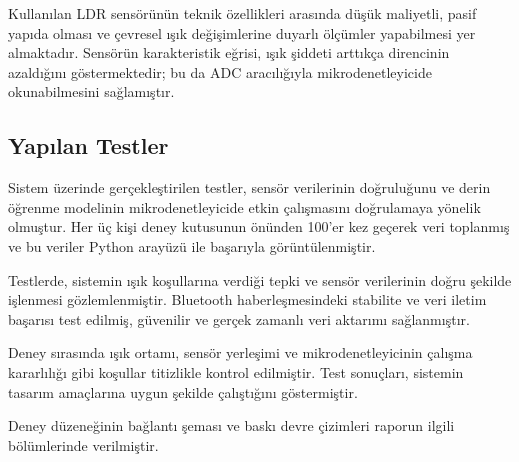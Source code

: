 Kullanılan LDR sensörünün teknik özellikleri arasında düşük maliyetli, pasif yapıda olması ve çevresel ışık değişimlerine duyarlı ölçümler yapabilmesi yer almaktadır. Sensörün karakteristik eğrisi, ışık şiddeti arttıkça direncinin azaldığını göstermektedir; bu da ADC aracılığıyla mikrodenetleyicide okunabilmesini sağlamıştır.

\subsection{Yapılan Testler}
Sistem üzerinde gerçekleştirilen testler, sensör verilerinin doğruluğunu ve derin öğrenme modelinin mikrodenetleyicide etkin çalışmasını doğrulamaya yönelik olmuştur. Her üç kişi deney kutusunun önünden 100'er kez geçerek veri toplanmış ve bu veriler Python arayüzü ile başarıyla görüntülenmiştir.

Testlerde, sistemin ışık koşullarına verdiği tepki ve sensör verilerinin doğru şekilde işlenmesi gözlemlenmiştir. Bluetooth haberleşmesindeki stabilite ve veri iletim başarısı test edilmiş, güvenilir ve gerçek zamanlı veri aktarımı sağlanmıştır.

Deney sırasında ışık ortamı, sensör yerleşimi ve mikrodenetleyicinin çalışma kararlılığı gibi koşullar titizlikle kontrol edilmiştir. Test sonuçları, sistemin tasarım amaçlarına uygun şekilde çalıştığını göstermiştir.

Deney düzeneğinin bağlantı şeması ve baskı devre çizimleri raporun ilgili bölümlerinde verilmiştir.

